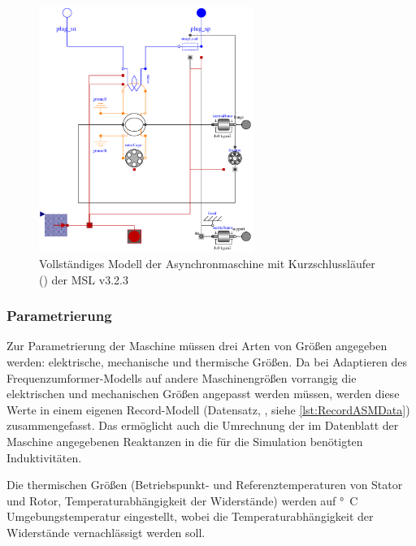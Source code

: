 \begin{figure}
\centering
\includegraphics[height=8cm]{Bilder/AIM_SquirrelCage.pdf}
\caption{Vollständiges Modell der Asynchronmaschine mit Kurzschlussläufer () der MSL v3.2.3}
\label{fig:ASM_vollstaendig}
\end{figure}


\subsubsection{Parametrierung}\label{sec:parametrierung-ASM}

Zur Parametrierung der Maschine müssen drei Arten von Größen angegeben werden: elektrische, mechanische und thermische Größen. Da bei Adaptieren des Fre­quenz­um­for­mer-Modells auf andere Maschinengrößen vorrangig die elektrischen und mechanischen Größen angepasst werden müssen, werden diese Werte in einem eigenen Record-Modell (Datensatz, , siehe \cref{lst:RecordASMData}) zusammengefasst. Das ermöglicht auch die Umrechnung der im Datenblatt der Maschine angegebenen Reaktanzen in die für die Simulation benötigten Induktivitäten.

Die thermischen Größen (Betriebspunkt- und Referenztemperaturen von Stator und Rotor, Temperaturabhängigkeit der Widerstände) werden auf \unit[20]{°C} Umgebungstemperatur eingestellt, wobei die Temperaturabhängigkeit der Widerstände vernachlässigt werden soll.

